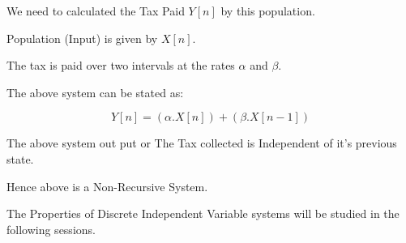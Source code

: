 We need to calculated the Tax Paid $Y[n]$ by this population. 

Population (Input) is given by $X[n]$.

The tax is paid over two intervals at the rates $\alpha$ and $\beta$.

The above system can be stated as:

$$Y[n]=(\alpha.X[n])+(\beta.X[n-1])$$

The above system out put or The Tax collected is Independent of it's previous state.

Hence above is a Non-Recursive System.



The Properties of Discrete Independent Variable systems will be studied in the following sessions.


